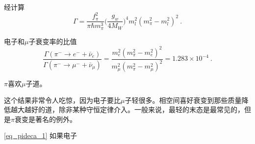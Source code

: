 经计算
\begin{equation}\label{eq_pideca_1}
\Gamma = \frac{f_\pi^2}{\pi \hbar m_\pi^3} \bigg( \frac{g_w}{4 M_W} \bigg)^4 m_l^2 (m_\pi^2 - m_l^2)^2 ~.
\end{equation}

电子和$\mu$子衰变率的比值
\begin{equation}
\frac{\Gamma(\pi^- \rightarrow e^- +\bar \nu_e)}{\Gamma(\pi^- \rightarrow \mu^- +\bar \nu_\mu)} = \frac{m_e^2(m_\pi^2-m_e^2)^2}{m_\mu^2(m_\pi^2-m_\mu^2)^2} = 1.283 \times 10^{-4}~.
\end{equation}

$\pi$喜欢$\mu$子道。

这个结果非常令人吃惊，因为电子要比$\mu$子轻很多。相空间喜好衰变到那些质量降低越大越好的道，除非某种守恒定律介入。一般来说，最轻的末态是最常见的，但是$\pi$衰变是著名的例外。

\autoref{eq_pideca_1} 如果电子